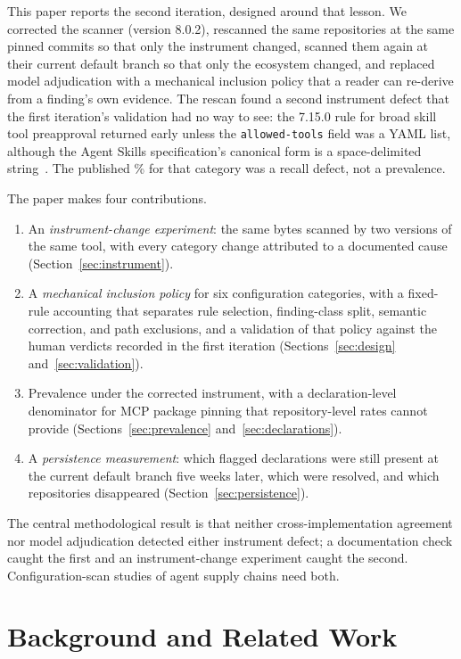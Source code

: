 \documentclass[10pt,conference]{IEEEtran}
\newcommand{\vold}{7.15.0}
\newcommand{\vnew}{8.0.2}
\newcommand{\pct}[1]{#1\%}
\begin{document}
This paper reports the second iteration, designed around that lesson. We corrected the scanner (version \vnew{}), rescanned the same \NCorpus{} repositories at the same pinned commits so that only the instrument changed, scanned them again at their current default branch so that only the ecosystem changed, and replaced model adjudication with a mechanical inclusion policy that a reader can re-derive from a finding's own evidence. The rescan found a second instrument defect that the first iteration's validation had no way to see: the \vold{} rule for broad skill tool preapproval returned early unless the \texttt{allowed-tools} field was a YAML list, although the Agent Skills specification's canonical form is a space-delimited string~\cite{agentskills_spec}. The published \pct{\SThreeOldSetupsPct} for that category was a recall defect, not a prevalence.

The paper makes four contributions.
\begin{enumerate}
\item An \emph{instrument-change experiment}: the same bytes scanned by two versions of the same tool, with every category change attributed to a documented cause (Section~\ref{sec:instrument}).
\item A \emph{mechanical inclusion policy} for six configuration categories, with a fixed-rule accounting that separates rule selection, finding-class split, semantic correction, and path exclusions, and a validation of that policy against the \HumanTotalVerdicts{} human verdicts recorded in the first iteration (Sections~\ref{sec:design} and~\ref{sec:validation}).
\item Prevalence under the corrected instrument, with a declaration-level denominator for MCP package pinning that repository-level rates cannot provide (Sections~\ref{sec:prevalence} and~\ref{sec:declarations}).
\item A \emph{persistence measurement}: which flagged declarations were still present at the current default branch five weeks later, which were resolved, and which repositories disappeared (Section~\ref{sec:persistence}).
\end{enumerate}

The central methodological result is that neither cross-implementation agreement nor model adjudication detected either instrument defect; a documentation check caught the first and an instrument-change experiment caught the second. Configuration-scan studies of agent supply chains need both.

\section{Background and Related Work}
\end{document}
